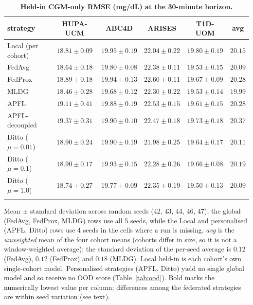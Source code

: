 \documentclass[10pt,letterpaper]{article}
\newlength\savedwidth
\newcommand\thickhline{\noalign{\global\savedwidth\arrayrulewidth\global\arrayrulewidth 2pt}%
\hline
\noalign{\global\arrayrulewidth\savedwidth}}
\begin{document}
\begin{table}[!ht]
\centering
\captionsetup{justification=centering,singlelinecheck=on}
\caption{\bf Held-in CGM-only RMSE (mg/dL) at the 30-minute horizon.}
\label{tab:main}
\begin{tabular}{lccccc}
\thickhline
strategy & HUPA-UCM & ABC4D & ARISES & T1D-UOM & avg \\
\hline
Local (per cohort) & $18.81 \pm 0.09$ & $19.95 \pm 0.19$ & $22.04 \pm 0.22$ & $19.80 \pm 0.19$ & $20.15$ \\
\hline
FedAvg  & $18.64 \pm 0.18$ & $19.80 \pm 0.08$ & $22.38 \pm 0.11$ & $19.53 \pm 0.15$ & $20.09$ \\
FedProx & $18.89 \pm 0.18$ & $19.94 \pm 0.13$ & $22.60 \pm 0.11$ & $19.67 \pm 0.09$ & $20.28$ \\
MLDG    & $\mathbf{18.46 \pm 0.28}$ & $\mathbf{19.68 \pm 0.12}$ & $22.30 \pm 0.22$ & $19.53 \pm 0.14$ & $\mathbf{19.99}$ \\
\hline
APFL           & $19.11 \pm 0.41$ & $19.88 \pm 0.19$ & $22.53 \pm 0.15$ & $19.61 \pm 0.15$ & $20.28$ \\
APFL-decoupled & $19.37 \pm 0.31$ & $19.90 \pm 0.10$ & $22.47 \pm 0.18$ & $19.73 \pm 0.18$ & $20.37$ \\
Ditto ($\mu{=}0.01$) & $18.90 \pm 0.24$ & $19.90 \pm 0.19$ & $\mathbf{21.98 \pm 0.25}$ & $19.64 \pm 0.17$ & $20.11$ \\
Ditto ($\mu{=}0.1$)  & $18.90 \pm 0.17$ & $19.93 \pm 0.15$ & $22.28 \pm 0.26$ & $19.66 \pm 0.08$ & $20.19$ \\
Ditto ($\mu{=}1.0$)  & $18.74 \pm 0.27$ & $19.77 \pm 0.09$ & $22.35 \pm 0.19$ & $\mathbf{19.50 \pm 0.13}$ & $20.09$ \\
\thickhline
\end{tabular}
\begin{center}
{\small Mean $\pm$ standard deviation across random seeds (42, 43, 44, 46, 47);
the global (FedAvg, FedProx, MLDG) rows use all 5 seeds, while the Local and
personalised (APFL, Ditto) rows use 4 seeds in the cells where a run is missing.
\emph{avg} is the \emph{unweighted} mean of the four cohort means (cohorts differ
in size, so it is not a window-weighted average); the standard deviation of the
per-seed average is $0.12$ (FedAvg), $0.12$ (FedProx) and $0.18$ (MLDG). Local
held-in is each cohort's own single-cohort model. Personalised strategies (APFL,
Ditto) yield no single global model and so receive no OOD score
(Table~\ref{tab:ood}). Bold marks the numerically lowest value per column;
differences among the federated strategies are within seed variation (see text).}
\end{center}
\end{table}
\end{document}
